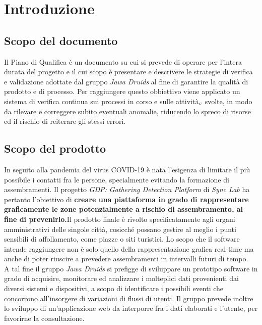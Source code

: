 \chapter{Introduzione}\label{Introduzione}

\section{Scopo del documento}\label{IntroduzioneScopoDelDocumento}
Il Piano di Qualifica è un documento su cui si prevede di operare per l’intera durata del progetto 
e il cui scopo è presentare e descrivere le strategie di verifica e validazione adottate 
dal gruppo \textit{Jawa Druids} al fine di garantire la qualità di prodotto e di processo.  
Per raggiungere questo obbiettivo viene applicato un sistema di verifica continua sui processi in corso e 
sulle attività$_{\scaleto{G}{3pt}}$ svolte, in modo da rilevare e correggere subito eventuali anomalie, riducendo lo spreco di risorse 
ed il rischio di reiterare gli stessi errori.

\section{Scopo del prodotto}\label{IntroduzioneScopodelProdotto}
In seguito alla pandemia del virus COVID-19 è nata l'esigenza di limitare il più possibile i
contatti fra le persone, specialmente evitando la formazione di assembramenti. 
Il progetto \textit{GDP: Gathering Detection Platform} di \textit{Sync Lab} ha pertanto l'obiettivo di \textbf{creare una piattaforma in grado di rappresentare graficamente le zone potenzialmente a rischio di assembramento, al fine di prevenirlo.}Il prodotto finale è rivolto specificatamente agli
organi amministrativi delle singole città, cosicché possano gestire al meglio i punti sensibili di
affollamento, come piazze o siti turistici. Lo scopo che il software intende raggiungere non è
solo quello della rappresentazione grafica real-time ma anche di poter riuscire a prevedere
assembramenti in intervalli futuri di tempo.
\\
A tal fine il gruppo \textit{Jawa Druids} si prefigge di sviluppare un prototipo software in grado di acquisire, monitorare ed analizzare i molteplici dati provenienti dai diversi sistemi e dispositivi, a scopo di identificare i possibili eventi che concorrono all'insorgere di variazioni di flussi di utenti. Il gruppo prevede inoltre lo sviluppo di un'applicazione web da interporre fra i dati elaborati e l'utente, per favorirne la consultazione.

